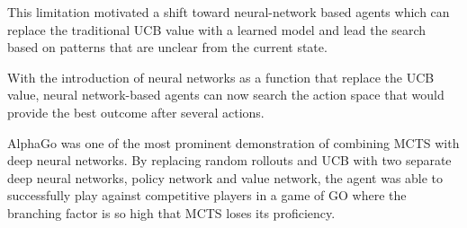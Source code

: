 This limitation motivated a shift toward neural-network based agents which can replace the traditional UCB value with a learned model and lead the search based on patterns that are unclear from the current state.

With the introduction of neural networks as a function that replace the UCB value, neural network-based agents can now search the action space that would provide the best outcome after several actions.

AlphaGo \cite{silver2017mastering} was one of the most prominent demonstration of combining MCTS with deep neural networks. By replacing  random rollouts and UCB with two separate deep neural networks, policy network and value network, the agent was able to successfully play against competitive players in a game of GO where the branching factor is so high that MCTS loses its proficiency. 